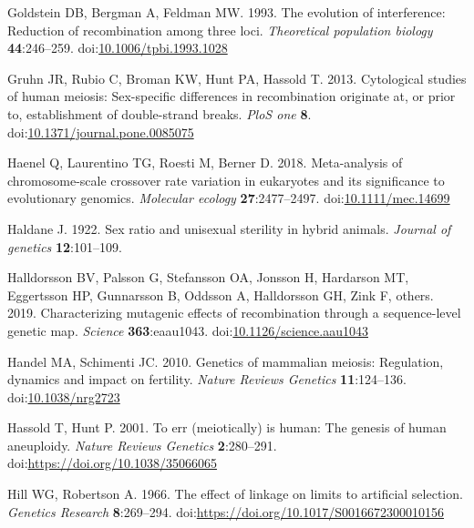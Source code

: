 \documentclass[
]{article}
\begin{document}
\leavevmode\hypertarget{ref-goldstein1993}{}%
Goldstein DB, Bergman A, Feldman MW. 1993. The evolution of
interference: Reduction of recombination among three loci.
\emph{Theoretical population biology} \textbf{44}:246--259.
doi:\href{https://doi.org/10.1006/tpbi.1993.1028}{10.1006/tpbi.1993.1028}

\leavevmode\hypertarget{ref-gruhn2013}{}%
Gruhn JR, Rubio C, Broman KW, Hunt PA, Hassold T. 2013. Cytological
studies of human meiosis: Sex-specific differences in recombination
originate at, or prior to, establishment of double-strand breaks.
\emph{PloS one} \textbf{8}.
doi:\href{https://doi.org/10.1371/journal.pone.0085075}{10.1371/journal.pone.0085075}

\leavevmode\hypertarget{ref-haenel2018}{}%
Haenel Q, Laurentino TG, Roesti M, Berner D. 2018. Meta-analysis of
chromosome-scale crossover rate variation in eukaryotes and its
significance to evolutionary genomics. \emph{Molecular ecology}
\textbf{27}:2477--2497.
doi:\href{https://doi.org/10.1111/mec.14699}{10.1111/mec.14699}

\leavevmode\hypertarget{ref-haldane1922sex}{}%
Haldane J. 1922. Sex ratio and unisexual sterility in hybrid animals.
\emph{Journal of genetics} \textbf{12}:101--109.

\leavevmode\hypertarget{ref-halldorsson2019}{}%
Halldorsson BV, Palsson G, Stefansson OA, Jonsson H, Hardarson MT,
Eggertsson HP, Gunnarsson B, Oddsson A, Halldorsson GH, Zink F, others.
2019. Characterizing mutagenic effects of recombination through a
sequence-level genetic map. \emph{Science} \textbf{363}:eaau1043.
doi:\href{https://doi.org/10.1126/science.aau1043}{10.1126/science.aau1043}

\leavevmode\hypertarget{ref-handel2010}{}%
Handel MA, Schimenti JC. 2010. Genetics of mammalian meiosis:
Regulation, dynamics and impact on fertility. \emph{Nature Reviews
Genetics} \textbf{11}:124--136.
doi:\href{https://doi.org/10.1038/nrg2723}{10.1038/nrg2723}

\leavevmode\hypertarget{ref-hassold2001}{}%
Hassold T, Hunt P. 2001. To err (meiotically) is human: The genesis of
human aneuploidy. \emph{Nature Reviews Genetics} \textbf{2}:280--291.
doi:\href{https://doi.org/https://doi.org/10.1038/35066065}{https://doi.org/10.1038/35066065}

\leavevmode\hypertarget{ref-hill1966}{}%
Hill WG, Robertson A. 1966. The effect of linkage on limits to
artificial selection. \emph{Genetics Research} \textbf{8}:269--294.
doi:\href{https://doi.org/https://doi.org/10.1017/S0016672300010156}{https://doi.org/10.1017/S0016672300010156}
\end{document}
